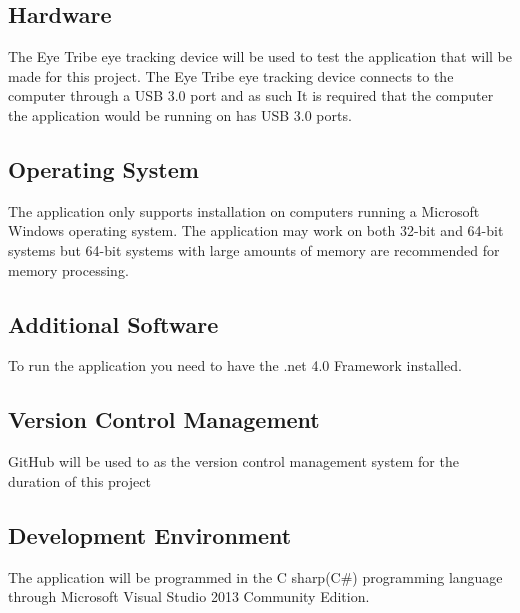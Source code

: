 \subsection{Hardware}
The Eye Tribe eye tracking device will be used to test the application that will be made for this project. The Eye Tribe eye tracking device  connects to the computer through a USB 3.0 port and as such It is required that the computer the application would be running on has USB 3.0 ports. 
\subsection{Operating System}
The application only supports installation on computers running a Microsoft Windows operating system. The application may work on both 32-bit and 64-bit systems but 64-bit systems with large amounts of memory are recommended for memory processing. 
\subsection{Additional Software}
To run the application you need to have the .net 4.0 Framework installed.
\subsection{Version Control Management}
GitHub will be used to as the version control management system for the duration of this project
\subsection{Development Environment}
The application will be programmed in the C sharp(C#) programming language through Microsoft Visual Studio 2013 Community Edition.
